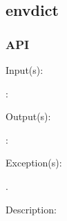 %
%
%
%
%              

\subsection{envdict}
\label{envdict}

\subsubsection{API}
\begin{capi}
\label{envdict_}
	\begin{capilist}
	\item[Input(s): ]
		\begin{description}\item[]
		\item[: ]
		\end{description}
	\item[Output(s): ]
		\begin{description}\item[]
		\item[: ]
		\end{description}
	\item[Exception(s): ]
		\begin{description}\item[]
		\item[.]
		\end{description}
	\item[Description: ]
	\end{capilist}
\end{capi}
